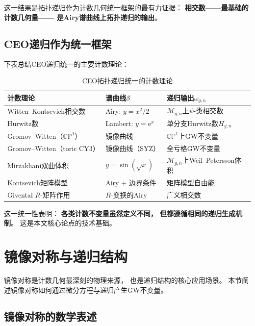 \documentclass[11pt,a4paper]{article}
\theoremstyle{plain}
\theoremstyle{definition}
\newcommand{\CP}{\mathbb{CP}}
\newcommand{\Mcal}{\mathcal{M}}
\newcommand{\ee}{\mathrm{e}}
\begin{document}
这一结果是拓扑递归作为计数几何统一框架的最有力证据：
\textbf{相交数——最基础的计数几何量——
是Airy谱曲线上拓扑递归的输出}。

\subsection{CEO递归作为统一框架}

下表总结CEO递归统一的主要计数理论：

\begin{table}[h]
\centering
\caption{CEO拓扑递归统一的计数理论}
\label{tab:unification}
\renewcommand{\arraystretch}{1.3}
\begin{tabularx}{\textwidth}{lXX}
\toprule
\textbf{计数理论} & \textbf{谱曲线$\mathcal{S}$} & \textbf{递归输出$\omega_{g,n}$} \\
\midrule
Witten--Kontsevich相交数 & Airy: $y = x^2/2$ & $\Mcal_{g,n}$上$\psi$-类相交数 \\
Hurwitz数 & Lambert: $y = \ee^x$ & 单分支Hurwitz数$H_{g,n}$ \\
Gromov--Witten（$\CP^1$） & 镜像曲线 & $\CP^1$上GW不变量 \\
Gromov--Witten（toric CY3） & 镜像曲线（SYZ） & 全亏格GW不变量 \\
Mirzakhani双曲体积 & $y = \sin(\sqrt{x})$ & $\Mcal_{g,n}$上Weil--Petersson体积 \\
Kontsevich矩阵模型 & Airy + 边界条件 & 矩阵模型自由能 \\
Givental $R$-矩阵作用 & $R$-变换的Airy & 广义相交数 \\
\bottomrule
\end{tabularx}
\end{table}

这一统一性表明：
\textbf{各类计数不变量虽然定义不同，
但都遵循相同的递归生成机制}。
这是本文核心论点的技术基础。




\section{镜像对称与递归结构}\label{sec:mirror}

镜像对称是计数几何最深刻的物理来源，
也是递归结构的核心应用场景。
本节阐述镜像对称如何通过微分方程与递归产生GW不变量。

\subsection{镜像对称的数学表述}
\end{document}
